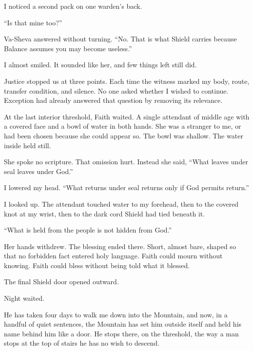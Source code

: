 I noticed a second pack on one warden's back.\par

``Is that mine too?''\par

Va-Sheva answered without turning. ``No. That is what Shield carries because Balance assumes you may become useless.''\par

I almost smiled. It sounded like her, and few things left still did.\par

Justice stopped us at three points. Each time the witness marked my body, route, transfer condition, and silence. No one asked whether I wished to continue. Exception had already answered that question by removing its relevance.\par

At the last interior threshold, Faith waited. A single attendant of middle age with a covered face and a bowl of water in both hands. She was a stranger to me, or had been chosen because she could appear so. The bowl was shallow. The water inside held still.\par

She spoke no scripture. That omission hurt. Instead she said, ``What leaves under seal leaves under God.''\par

I lowered my head. ``What returns under seal returns only if God permits return.''\par

I looked up. The attendant touched water to my forehead, then to the covered knot at my wrist, then to the dark cord Shield had tied beneath it.\par

``What is held from the people is not hidden from God.''\par

Her hands withdrew. The blessing ended there. Short, almost bare, shaped so that no forbidden fact entered holy language. Faith could mourn without knowing. Faith could bless without being told what it blessed.\par

The final Shield door opened outward.\par

Night waited.\par

\ornament

He has taken four days to walk me down into the Mountain, and now, in a handful of quiet sentences, the Mountain has set him outside itself and held his name behind him like a door. He stops there, on the threshold, the way a man stops at the top of stairs he has no wish to descend.\par

